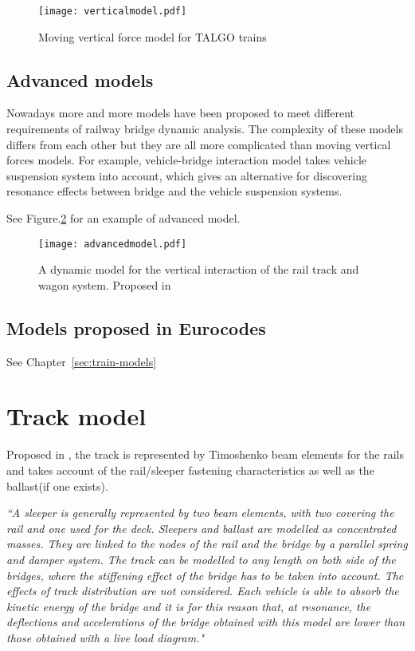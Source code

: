 \begin{figure}[h]
	\centering
	\texttt{[image: verticalmodel.pdf]}
	\caption{Moving vertical force model for TALGO trains}
	\label{fig:verticalmodel}
\end{figure}

\subsection{Advanced models}
Nowadays more and more models have been proposed to meet different requirements of railway bridge dynamic analysis. The complexity of these models differs from each other but they are all more complicated than moving vertical forces models. For example, vehicle-bridge interaction model takes vehicle suspension system into account, which gives an alternative for discovering resonance effects between bridge and the vehicle suspension systems. 

See Figure.\ref{fig:advancedmodel} for an example of advanced model.

\begin{figure}[p]
	\centering
	\texttt{[image: advancedmodel.pdf]}
	\caption{A dynamic model for the vertical interaction of the rail track and wagon system. Proposed in \cite{sun2002dynamic}}
	\label{fig:advancedmodel}
\end{figure}


\subsection{Models proposed in Eurocodes}

See Chapter~\ref{sec:train-models}

\section{Track model}
Proposed in \cite[A.6.1.3]{uic}, the track is represented by Timoshenko beam elements for the rails and takes account of the rail/sleeper fastening characteristics as well as the ballast(if one exists).

\textit{``A sleeper is generally represented by two beam elements, with two covering the rail and one used for the deck. Sleepers and ballast are modelled as concentrated masses. They are linked to the nodes of the rail and the bridge by a parallel spring and damper system. The track can be modelled to any length on both side of the bridges, where the stiffening effect of the bridge has to be taken into account. The effects of track distribution are not considered. Each vehicle is able to absorb the kinetic energy of the bridge and it is for this reason that, at resonance, the deflections and accelerations of the bridge obtained with this model are lower than those obtained with a live load diagram."}

